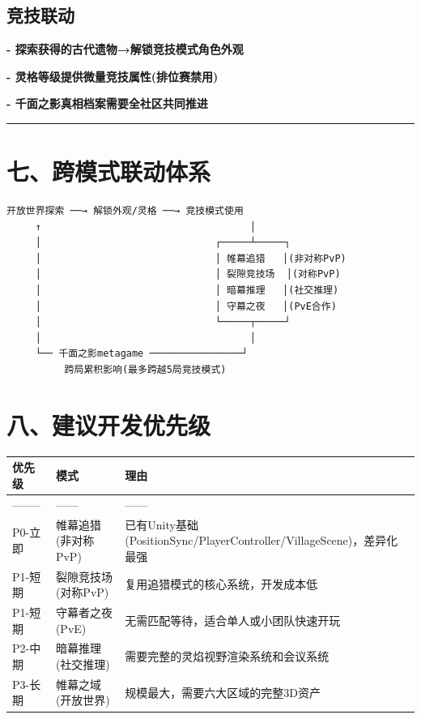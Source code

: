 \documentclass[12pt,a4paper,openany]{ctexbook}
\begin{document}
\section*{竞技联动}


\textbf{- 探索获得的古代遗物→解锁竞技模式角色外观}

\textbf{- 灵格等级提供微量竞技属性(排位赛禁用)}

\textbf{- 千面之影真相档案需要全社区共同推进}


\bigskip\hrule\bigskip


\chapter{七、跨模式联动体系}


\begin{verbatim}
开放世界探索 ──→ 解锁外观/灵格 ──→ 竞技模式使用
     ↑                                    │
     │                              ┌─────┴─────┐
     │                              │ 帷幕追猎   │(非对称PvP)
     │                              │ 裂隙竞技场  │(对称PvP)
     │                              │ 暗幕推理   │(社交推理)
     │                              │ 守幕之夜   │(PvE合作)
     │                              └─────┬─────┘
     │                                    │
     └── 千面之影metagame ────────────────┘
          跨局累积影响(最多跨越5局竞技模式)
\end{verbatim}


\chapter{八、建议开发优先级}


\begin{tabular}{|l|l|l|}
\hline
优先级 & 模式 & 理由 \\
\hline
-------- & ------ & ------ \\
P0-立即 & 帷幕追猎(非对称PvP) & 已有Unity基础(PositionSync/PlayerController/VillageScene)，差异化最强 \\
P1-短期 & 裂隙竞技场(对称PvP) & 复用追猎模式的核心系统，开发成本低 \\
P1-短期 & 守幕者之夜(PvE) & 无需匹配等待，适合单人或小团队快速开玩 \\
P2-中期 & 暗幕推理(社交推理) & 需要完整的灵焰视野渲染系统和会议系统 \\
P3-长期 & 帷幕之域(开放世界) & 规模最大，需要六大区域的完整3D资产 \\
\hline
\end{tabular}
\end{document}

